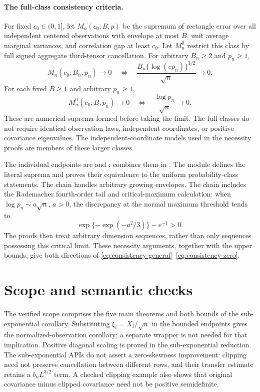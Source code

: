 \documentclass[11pt]{article}
\begin{document}
\paragraph{The full-class consistency criteria.}
For fixed $c_0\in(0,1]$, let $M_n(c_0;B,p)$ be the supremum of
rectangle error over all independent centered observations with envelope
at most $B$, unit average marginal variances, and correlation gap at
least $c_0$. Let $M_n^0$ restrict this class by full signed aggregate
third-tensor cancellation. For arbitrary $B_n\ge2$ and $p_n\ge1$,
\begin{equation}
 M_n(c_0;B_n,p_n)\longrightarrow0
 \quad\Longleftrightarrow\quad
 \frac{B_n\{\log(ep_n)\}^{3/2}}{\sqrt n}\longrightarrow0.
 \label{eq:consistency-general}
\end{equation}
For each fixed $B\ge1$ and arbitrary $p_n\ge1$,
\begin{equation}
 M_n^0(c_0;B,p_n)\longrightarrow0
 \quad\Longleftrightarrow\quad
 \frac{\log p_n}{\sqrt n}\longrightarrow0.
 \label{eq:consistency-zero}
\end{equation}
These are numerical suprema formed before taking the limit. The full
classes do not require identical observation laws, independent
coordinates, or positive covariance eigenvalues. The independent-coordinate
models used in the necessity proofs are members of these larger classes.

The individual endpoints are  and
;
 combines them in
. The  module
defines the literal suprema and proves their equivalence to the uniform
probability-class statements. The  chain
handles arbitrary growing envelopes. The 
chain includes the Rademacher fourth-order tail and critical-maximum
calculation: when $\log p_n\sim a\sqrt n$, $a>0$, the discrepancy
at the normal maximum threshold tends to
\[
 \exp\{-\exp(-a^2/3)\}-e^{-1}>0.
\]
The proofs then treat arbitrary dimension sequences, rather than only
sequences possessing this critical limit. These necessity arguments,
together with the upper bounds, give both directions of
\eqref{eq:consistency-general}--\eqref{eq:consistency-zero}.

\section{Scope and semantic checks}
The verified scope comprises the five main theorems and both bounds of
the sub-exponential corollary. Substituting $\xi_i=X_i/\sqrt n$ in the
bounded endpoints gives the normalized-observation corollary; a separate
wrapper is not needed for that implication. Positive diagonal scaling
is proved in the sub-exponential reduction. The sub-exponential APIs do
not assert a zero-skewness improvement: clipping need not preserve
cancellation between different rows, and their transfer estimate retains
a $b_nL^{3/2}$ term. A checked clipping example also shows that original
covariance minus clipped covariance need not be positive semidefinite.
\end{document}
